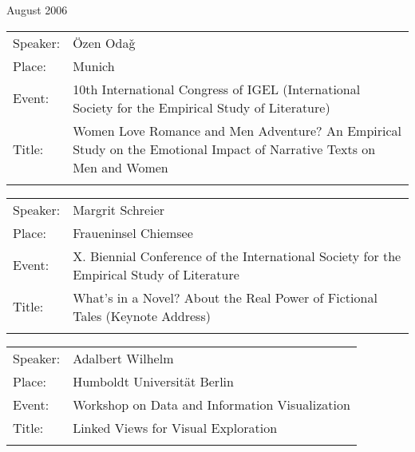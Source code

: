 {\begin{flushleft}
August 2006\\[0.5cm] 
\end{flushleft}
\begin{tabular}{lp{13.4cm}}
 Speaker:	&  \"{O}zen Oda\v{g} \\
 Place: 	 &Munich\\
 Event:   &	10th International Congress of IGEL (International Society for the Empirical Study of Literature)\\
 Title: &	Women Love Romance and Men Adventure? An Empirical Study on the Emotional Impact of Narrative Texts on Men and Women\\ \\
\end{tabular}
\begin{tabular}{lp{13.4cm}}
 Speaker:	&  Margrit Schreier \\
 Place: 	 &Fraueninsel Chiemsee\\
 Event:   &	X. Biennial Conference of the International Society for the Empirical Study of Literature\\
 Title: &	What's in a Novel? About the Real Power of Fictional Tales (Keynote Address)\\ \\
\end{tabular}
\begin{tabular}{lp{13.4cm}}
 Speaker:	&  Adalbert Wilhelm \\
 Place: 	 &Humboldt Universit\"{a}t Berlin\\
 Event:   &	Workshop on Data and Information Visualization\\
 Title: &	Linked Views for Visual Exploration\\ \\
\end{tabular}
	




}
